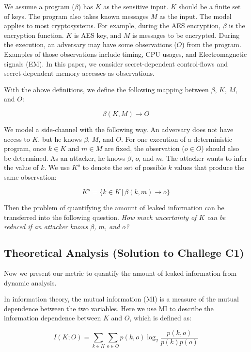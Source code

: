 We assume a program ($\beta$) has $K$ as the sensitive input. $K$ should be a
finite set of keys. The program also takes known messages $M$ as the input. The
model applies to most cryptosystems. For example, during the AES encryption,
$\beta$ is the encryption function. $K$ is AES key, and $M$ is messages to be
encrypted. During the execution, an adversary may have some observations ($O$)
from the program. Examples of those observations include timing, CPU usages, and
Electromagnetic signals (EM). In this paper, we consider secret-dependent
control-flows and secret-dependent memory accesses as observations.

With the above definitions, we define the following mapping between $\beta$,
$K$, $M$, and $O$:

\begin{displaymath}
    \beta(K, M) \rightarrow O
\end{displaymath}

We model a side-channel with the following way. An adversary does not have
access to $K$, but he knows $\beta$, $M$, and $O$. For one execution of a
deterministic program, once $k \in K$ and $m \in M$ are fixed, the observation
($o \in O$) should also be determined. As an attacker, he knows $\beta$, $o$,
and $m$. The attacker wants to infer the value of $k$. We use $K^o$ to denote
the set of possible $k$ values that produce the same observation:

\begin{displaymath}
    K^o = \{ k \in K \, |\, \beta(k, m) \rightarrow o\}
\end{displaymath}

Then the problem of quantifying the amount of leaked information can be
transferred into the following question.
\emph{How much uncertainty of $K$ can be reduced if an attacker knows $\beta$, $m$, and $o$?}

\subsection{Theoretical Analysis \textbf{(Solution to Challege C1)}}
Now we present our metric to quantify the amount of leaked information from
dynamic analysis.

In information theory, the mutual information (MI) is a measure of the mutual
dependence between the two variables. Here we use MI to describe the information
dependence between $K$ and $O$, which is defined as:

\begin{equation} \label{eq:1}
    I(K;O) = \sum_{k {\in} K}{\sum_{o {\in} O}{p(k, o)\log_2\frac{p(k, o)}{p(k)p(o)}}}
\end{equation}


